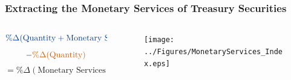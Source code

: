 \documentclass[11pt, handout, aspectratio=169]{beamer}
\newcommand\mathcomment[2]{
	\tikz[baseline]{\node[anchor=base,inner sep=0pt,outer sep=2pt] (myterm) {$#1$};
	\node[overlay,anchor=south,yshift=1em] (mycomment) at (myterm.north) {#2};
	\draw[overlay,->] (mycomment.south) -- (myterm.north);
	}
}
\begin{document}
\begin{frame}
\frametitle{Extracting the Monetary Services of Treasury Securities}
\begin{columns}[t]
	\begin{column}{.45\textwidth}
		\vspace{2em}
		\begin{equation*}
				{\color{blue}\%\Delta(\text{Quantity}+\text{Monetary Services})}
		\end{equation*} \vfill
		\begin{equation*}
			-
				{\color{red}\%\Delta(\text{Quantity})}
		\end{equation*} \vfill
		\begin{equation*}
			= \%\Delta(\text{Monetary Services})
		\end{equation*}
	\end{column}
	\begin{column}{.55\textwidth}
		\begin{figure}[p]
			\centering
			\texttt{[image: ../Figures/MonetaryServices\_Index.eps]}
		\end{figure}
	\end{column}
\end{columns}
\end{frame}
\end{document}
